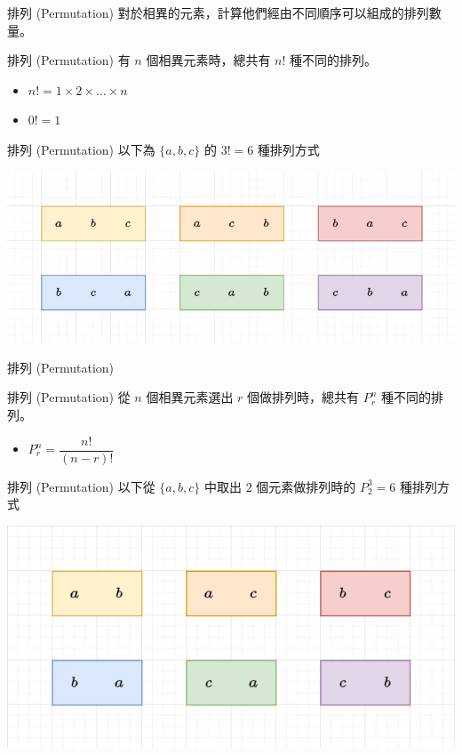 \documentclass[aspectratio=169]{beamer}
\begin{document}
\begin{frame}{排列 (Permutation)}
    對於相異的元素，計算他們經由不同順序可以組成的排列數量。
    \begin{alertblock}{排列 (Permutation)}
        有 $n$ 個相異元素時，總共有 $n!$ 種不同的排列。 
        \begin{itemize}
            \item $n! = 1 \times 2 \times \dots \times n$
            \item $0! = 1$
        \end{itemize}
    \end{alertblock}
\end{frame}

\begin{frame}{排列 (Permutation)}
    以下為 $\{a,b,c\}$ 的 $3! = 6$ 種排列方式
    \begin{center}
        \includegraphics[width=\textwidth]{images/permutation.png}
    \end{center}
\end{frame}

\begin{frame}{排列 (Permutation)}
    \begin{alertblock}{排列 (Permutation)}
        從 $n$ 個相異元素選出 $r$ 個做排列時，總共有 $P^n_r$ 種不同的排列。 
        \begin{itemize}
            \item $P^n_r = \dfrac{n!}{(n-r)!}$
        \end{itemize}
    \end{alertblock}
\end{frame}

\begin{frame}{排列 (Permutation)}
    以下從 $\{a,b,c\}$ 中取出 $2$ 個元素做排列時的 $P^3_2 = 6$ 種排列方式
    \begin{center}
        \includegraphics[scale=0.75]{images/nPr.png}
    \end{center}
\end{frame}
\end{document}
